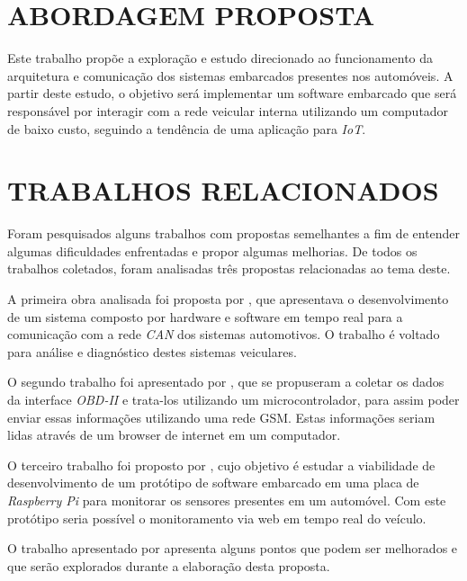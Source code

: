 \section{ABORDAGEM PROPOSTA}
Este trabalho propõe a exploração e estudo direcionado ao funcionamento da arquitetura e comunicação dos sistemas embarcados presentes nos automóveis. A partir deste estudo, o objetivo será implementar um software embarcado que será responsável por interagir com a rede veicular interna utilizando um computador de baixo custo, seguindo a tendência de uma aplicação para \textit{IoT}.

\section{TRABALHOS RELACIONADOS}
Foram pesquisados alguns trabalhos com propostas semelhantes a fim de entender algumas dificuldades enfrentadas e propor algumas melhorias. De todos os trabalhos coletados, foram analisadas três propostas relacionadas ao tema deste.

A primeira obra analisada foi proposta por , que apresentava o desenvolvimento de um sistema composto por hardware e software em tempo real para a comunicação com a rede \textit{CAN} dos sistemas automotivos. O trabalho é voltado para análise e diagnóstico destes sistemas veiculares.

O segundo trabalho foi apresentado por , que se propuseram a coletar os dados da interface \textit{OBD-II} e trata-los utilizando um microcontrolador, para assim poder enviar essas informações utilizando uma rede GSM. Estas informações seriam lidas através de um browser de internet em um computador.

O terceiro trabalho foi proposto por , cujo objetivo é estudar a viabilidade de desenvolvimento de um protótipo de software embarcado em uma placa de \textit{Raspberry Pi} para monitorar os sensores presentes em um automóvel. Com este protótipo seria possível o monitoramento via web em tempo real do veículo.

O trabalho apresentado por  apresenta alguns pontos que podem ser melhorados e que serão explorados durante a elaboração desta proposta.



